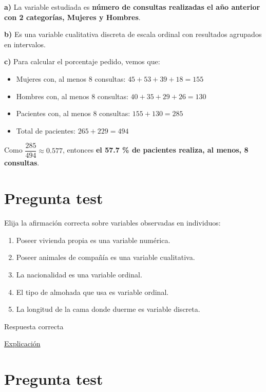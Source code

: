 \documentclass[
]{book}
\providecommand{\tightlist}{%
  \setlength{\itemsep}{0pt}\setlength{\parskip}{0pt}}
\begin{document}
\textbf{a)} La variable estudiada es \textbf{número de consultas realizadas el año anterior con 2 categorías, Mujeres y Hombres}.

\textbf{b)} Es una variable cualitativa discreta de escala ordinal con resultados agrupados en intervalos.

\textbf{c)} Para calcular el porcentaje pedido, vemos que:

\begin{itemize}
\item
  Mujeres con, al menos 8 consultas: \(45 + 53 + 39 + 18 = 155\)
\item
  Hombres con, al menos 8 consultas: \(40 + 35 + 29 + 26 = 130\)
\item
  Pacientes con, al menos 8 consultas: \(155 + 130 = 285\)
\item
  Total de pacientes: \(265 + 229 = 494\)
\end{itemize}

Como \(\dfrac{285}{494} \approx 0.577\), entonces \textbf{el 57.7 \% de pacientes realiza, al menos, 8 consultas}.

\hypertarget{pregunta-test-16}{%
\section{Pregunta test}\label{pregunta-test-16}}

Elija la afirmación correcta sobre variables observadas en individuos:

\begin{enumerate}
\def\labelenumi{\alph{enumi})}
\tightlist
\item
  Poseer vivienda propia es una variable numérica.
\item
  Poseer animales de compañía es una variable cualitativa.
\item
  La nacionalidad es una variable ordinal.
\item
  El tipo de almohada que usa es variable ordinal.
\item
  La longitud de la cama donde duerme es variable discreta.
\end{enumerate}

Respuesta correcta

\href{https://1fjmanzano.github.io/bioestadistica/tipos-de-variables.html}{Explicación}

\hypertarget{pregunta-test-17}{%
\section{Pregunta test}\label{pregunta-test-17}}
\end{document}
